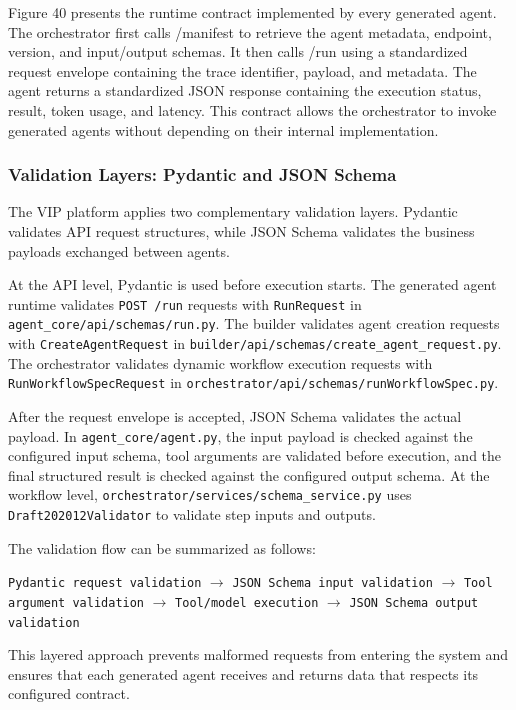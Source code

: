 Figure 40 presents the runtime contract implemented by every generated agent. The orchestrator first calls /manifest to retrieve the agent metadata, endpoint, version, and input/output schemas. It then calls /run using a standardized request envelope containing the trace identifier, payload, and metadata. The agent returns a standardized JSON response containing the execution status, result, token usage, and latency. This contract allows the orchestrator to invoke generated agents without depending on their internal implementation.

\subsubsection{Validation Layers: Pydantic and JSON Schema}
\label{sec:validation-layers}

The VIP platform applies two complementary validation layers. Pydantic validates API request structures, while JSON Schema validates the business payloads exchanged between agents.

At the API level, Pydantic is used before execution starts. The generated agent runtime validates \texttt{POST /run} requests with \texttt{RunRequest} in \texttt{agent\_core/api/schemas/run.py}. The builder validates agent creation requests with \texttt{CreateAgentRequest} in \texttt{builder/api/schemas/create\_agent\_request.py}. The orchestrator validates dynamic workflow execution requests with \texttt{RunWorkflowSpecRequest} in \texttt{orchestrator/api/schemas/runWorkflowSpec.py}.

After the request envelope is accepted, JSON Schema validates the actual payload. In \texttt{agent\_core/agent.py}, the input payload is checked against the configured input schema, tool arguments are validated before execution, and the final structured result is checked against the configured output schema. At the workflow level, \texttt{orchestrator/services/schema\_service.py} uses \texttt{Draft202012Validator} to validate step inputs and outputs.

The validation flow can be summarized as follows:

\begin{center}
\texttt{Pydantic request validation}
$\rightarrow$
\texttt{JSON Schema input validation}
$\rightarrow$
\texttt{Tool argument validation}
$\rightarrow$
\texttt{Tool/model execution}
$\rightarrow$
\texttt{JSON Schema output validation}
\end{center}

This layered approach prevents malformed requests from entering the system and ensures that each generated agent receives and returns data that respects its configured contract.

